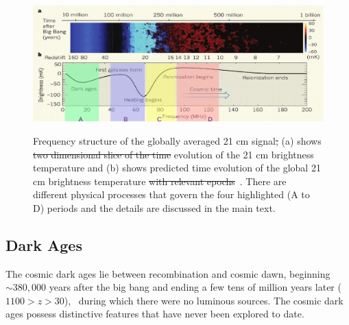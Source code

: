 	\begin{figure}
		\begin{center}
			\includegraphics[width=\linewidth]{Figures/epo.pdf}\\
			\caption{Frequency structure of the globally averaged 21 cm signal\st{,}\attention{:} (a) shows  \st{two dimensional slice of the time} evolution of the 21 cm brightness temperature and (b) shows  predicted time evolution of the global 21 cm brightness temperature \st{with relevant epochs}~\citep{2012RPPh...75h6901P}. There are different physical processes that govern the four highlighted (A to D) periods and the details are discussed in the main text.}
			
			
			\label{Fig:epochs}
		\end{center}
	\end{figure}
	
	\subsection{Dark Ages}
	
	The cosmic dark ages lie between recombination and cosmic dawn, beginning $\sim380,000$ years after the big bang and ending a few tens of million years later ($1100 > z > 30$),~\citep{2014arXiv1412.2096J}  during which there were no luminous sources. The cosmic dark ages possess distinctive features that have never been explored to date. 
	
